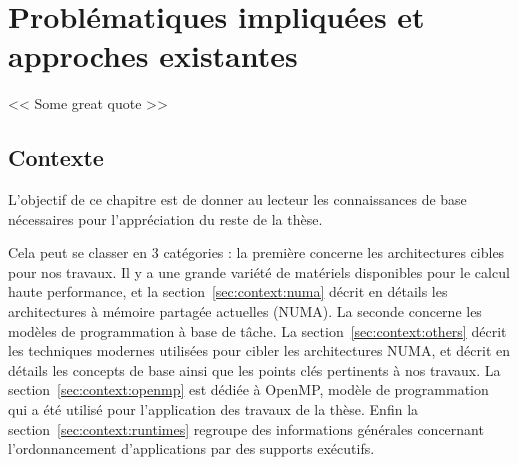 \part{Problématiques impliquées et approches existantes}

\begin{savequote}[6cm]
<< Some great quote  >>
\end{savequote}
\chapter{Contexte}
\chaptertoc

L'objectif de ce chapitre est de donner au lecteur les connaissances de base nécessaires pour l'appréciation du reste de la thèse.

Cela peut se classer en 3 catégories : la première concerne les architectures cibles pour nos travaux. Il y a une grande variété de matériels disponibles pour le calcul haute performance, et la section~\ref{sec:context:numa} décrit en détails les architectures à mémoire partagée actuelles (NUMA).
La seconde concerne les modèles de programmation à base de tâche. La section~\ref{sec:context:others} décrit les techniques modernes utilisées pour cibler les architectures NUMA, et décrit en détails les concepts de base ainsi que les points clés pertinents à nos travaux. La section~\ref{sec:context:openmp} est dédiée à OpenMP, modèle de programmation qui a été utilisé pour l'application des travaux de la thèse.
Enfin la section~\ref{sec:context:runtimes} regroupe des informations générales concernant l'ordonnancement d'applications par des supports exécutifs.







